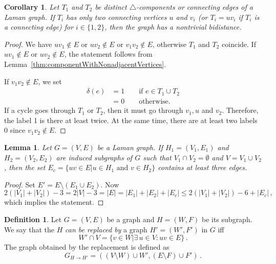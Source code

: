 \documentclass[a4paper, 11pt]{article}
\newcommand{\trcomps}{$\triangle$-components}
\newtheorem{lem}[thm]{Lemma}
\newtheorem{cor}[thm]{Corollary}
\theoremstyle{definition}
\newtheorem{defn}{Definition}[section]
\begin{document}
\begin{cor}
Let $T_1$ and $T_2$ be distinct \trcomps{} or connecting edges of a Laman graph. If $T_i$ has only two connecting vertices $u$ and $v_i$ (or $T_i=uv_i$ if $T_i$ is a connecting edge) for $i\in\{1,2\}$, then  the graph has a nontrivial bidistance.
\end{cor}
\begin{proof}
We have $uv_1\notin E$ or $uv_2\notin E$ or $v_1v_2\notin E$, otherwise $T_1$ and $T_2$ coincide.
If $uv_1\notin E$ or $uv_2\notin E$, the statement follows from Lemma~\ref{thm:componentWithNonadjacentVertices}.

If $v_1v_2\notin E$, we set 
\begin{align*}
\delta(e)&=1 \qquad \text{if } e\in T_1\cup T_2 \\
		&=0 \qquad \text{otherwise.}
\end{align*} 
If a cycle goes through $T_1$ or $T_2$, then it must go through  $v_1, u$ and $v_2$. Therefore, the label 1 is there at least twice. At the same time, there are at least two labels 0 since  $v_1v_2\notin E$.
\end{proof}

\begin{lem}
\label{lem:numEdgesBetweenTwoParts}
Let $G=(V,E)$ be a Laman graph. If $H_1=(V_1,E_1)$ and $H_2=(V_2,E_2)$ are induced subgraphs of $G$ such that $V_1 \cap V_2=\emptyset$ and $V=V_1\cup V_2$, then the set $E_c=\{uv\in E | u\in H_1 \text{ and } v\in H_2\}$ contains at least three edges.
\end{lem}
\begin{proof}
Set $E'=E\setminus(E_1 \cup E_2)$. Now
$$
2(|V_1|+|V_2|)-3=2|V|-3=|E|=|E_1|+|E_2|+|E_c| \leq 2(|V_1|+|V_2|)-6 +|E_c|\,,
$$
which implies the statement.
\end{proof}

\begin{defn}
Let $G=(V,E)$ be a graph and $H=(W,F)$ be its subgraph. We say that the $H$ \emph{can be replaced by} a graph $H'=(W',F')$ in $G$ iff
$$
W'\cap V=\{v\in W | \exists\, u\in V \colon uv\in E\}\,.
$$
The graph obtained by the replacement is defined as
$$
G_{H\rightarrow H'}=\left((V\setminus W)\cup W', (E\setminus F)\cup F'\right)\,.
$$
\end{defn}
\end{document}
